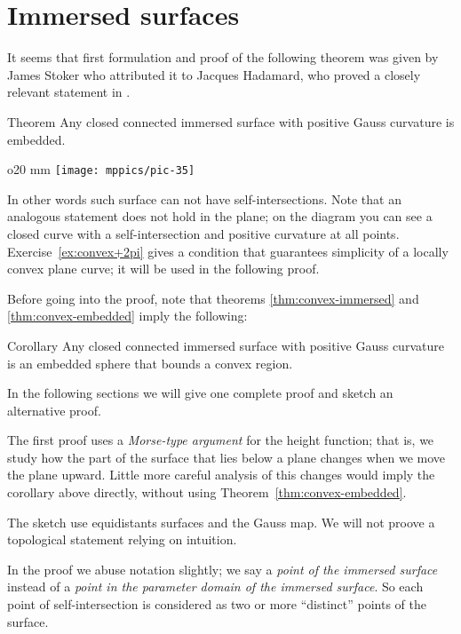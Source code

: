 \section*{Immersed surfaces}

It seems that first formulation and proof of the following theorem was given by James Stoker \cite{stoker} who attributed it to Jacques Hadamard, who proved a closely relevant statement in \cite[item 23]{hadamard}.


\begin{thm}{Theorem}\label{thm:convex-immersed}
Any closed connected immersed surface with positive Gauss curvature is embedded.
\end{thm}



\begin{wrapfigure}{o}{20 mm}
\vskip-0mm
\centering
\texttt{[image: mppics/pic-35]}
\vskip-0mm
\end{wrapfigure}

In other words such surface can not have self-intersections.
Note that an analogous statement does not hold in the plane;
on the diagram you can see a closed curve with a self-intersection and positive curvature at all points.
Exercise~\ref{ex:convex+2pi} gives a condition that guarantees simplicity of a locally convex plane curve;
it will be used in the following proof.



Before going into the proof, note that theorems \ref{thm:convex-immersed} and \ref{thm:convex-embedded}
imply the following:

\begin{thm}{Corollary}
Any closed connected immersed surface with positive Gauss curvature is an embedded sphere that bounds a convex region.
\end{thm}

In the following sections we will give one complete proof and sketch an alternative proof.

The first proof uses a \emph{Morse-type argument} for the height function;
that is, we study how the part of the surface that lies below a plane changes when we move the plane upward.
Little more careful analysis of this changes would imply the corollary above directly, without using Theorem~\ref{thm:convex-embedded}.

The sketch use equidistants surfaces and the Gauss map.
We will not proove a topological statement relying on intuition.

In the proof we abuse notation slightly;
we say a \emph{point of the immersed surface} instead of a \emph{point in the parameter domain of the immersed surface}.
So each point of self-intersection is considered as two or more ``distinct'' points of the surface.

